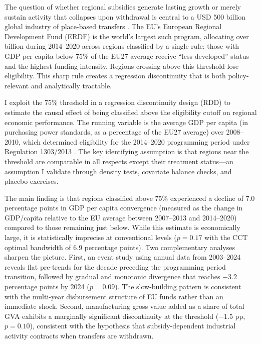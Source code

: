 \documentclass[12pt]{article}
\begin{document}
The question of whether regional subsidies generate lasting growth or merely sustain activity that collapses upon withdrawal is central to a USD 500 billion global industry of place-based transfers \citep{NeumarkSimpson2015, KlineMoretti2014}. The EU's European Regional Development Fund (ERDF) is the world's largest such program, allocating over  billion during 2014--2020 across regions classified by a single rule: those with GDP per capita below 75\% of the EU27 average receive ``less developed'' status and the highest funding intensity. Regions crossing above this threshold lose eligibility. This sharp rule creates a regression discontinuity that is both policy-relevant and analytically tractable.

I exploit the 75\% threshold in a regression discontinuity design (RDD) to estimate the causal effect of being classified above the eligibility cutoff on regional economic performance. The running variable is the average GDP per capita (in purchasing power standards, as a percentage of the EU27 average) over 2008--2010, which determined eligibility for the 2014--2020 programming period under Regulation 1303/2013 \citep{Regulation1303}. The key identifying assumption is that regions near the threshold are comparable in all respects except their treatment status---an assumption I validate through density tests, covariate balance checks, and placebo exercises.

The main finding is that regions classified above 75\% experienced a decline of 7.0 percentage points in GDP per capita convergence (measured as the change in GDP/capita relative to the EU average between 2007--2013 and 2014--2020) compared to those remaining just below. While this estimate is economically large, it is statistically imprecise at conventional levels ($p = 0.17$ with the CCT optimal bandwidth of 6.9 percentage points). Two complementary analyses sharpen the picture. First, an event study using annual data from 2003--2024 reveals flat pre-trends for the decade preceding the programming period transition, followed by gradual and monotonic divergence that reaches $-3.2$ percentage points by 2024 ($p = 0.09$). The slow-building pattern is consistent with the multi-year disbursement structure of EU funds rather than an immediate shock. Second, manufacturing gross value added as a share of total GVA exhibits a marginally significant discontinuity at the threshold ($-1.5$ pp, $p = 0.10$), consistent with the hypothesis that subsidy-dependent industrial activity contracts when transfers are withdrawn.
\end{document}
